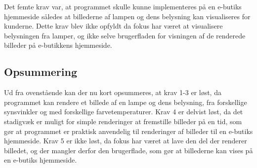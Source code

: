Det femte krav var, at programmet skulle kunne implementeres på en e-butiks hjemmeside således at billederne af lampen og dens belysning kan visualiseres for kunderne. Dette krav blev ikke opfyldt da fokus har været at visualisere belysningen fra lamper, og ikke selve brugerfladen for visningen af de renderede billeder på e-butikkens hjemmeside.  

\subsection*{Opsummering}

Ud fra ovenstående kan der nu kort opsummeres, at krav 1-3 er løst, da programmet kan rendere et billede af en lampe og dens belysning, fra forskellige synsvinkler og med forskellige farvetemperaturer. Krav 4 er delvist løst, da det stadigvæk er muligt for simple renderinger at fremstille billeder på en tid, som gør at programmet er praktisk anvendelig til renderinger af billeder til en e-butiks hjemmeside. Krav 5 er ikke løst, da fokus har været at lave den del der renderer billedet, og der mangler derfor den brugerflade, som gør at billederne kan vises på en e-butiks hjemmeside. 
\clearpage